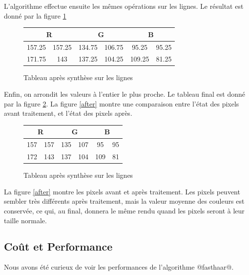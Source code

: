\documentclass{article}
\begin{document}
L'algorithme effectue ensuite les mêmes opérations sur les lignes. Le résultat est donné par la figure  \ref{tab6}

\begin{figure}[!h]
\begin{center}
\begin{tabular}{|c|c|c|c|c|c|}
\hline
\multicolumn{2}{|c|}{R} & \multicolumn{2}{|c|}{G}  & \multicolumn{2}{|c|}{B} \\
\hline
157.25    & 157.25   &   134.75  & 106.75 &   95.25  & 95.25   \\ 
\hline
171.75    & 143   &   137.25  & 104.25 &   109.25  & 81.25 \\
\hline
\end{tabular}
\end{center}
\caption{Tableau après synthèse sur les lignes}
\label{tab6}
\end{figure}

Enfin, on arrondit les valeurs à l'entier le plus proche. Le tableau final est donné par la figure \ref{tab7}. La figure \ref{after} montre une comparaison entre l'état des pixels avant traitement, et l'état des pixels après.

\begin{figure}[!h]
\begin{center}
\begin{tabular}{|c|c|c|c|c|c|}
\hline
\multicolumn{2}{|c|}{R} & \multicolumn{2}{|c|}{G}  & \multicolumn{2}{|c|}{B} \\
\hline
157    & 157  &   135  & 107 &   95  & 95   \\ 
\hline
172   & 143   &   137  & 104 &   109  & 81 \\
\hline
\end{tabular}
\end{center}
\caption{Tableau après synthèse sur les lignes}
\label{tab7}
\end{figure}


La figure \ref{after} montre les pixels avant et après traitement. Les pixels peuvent sembler très différents après traitement, mais la valeur moyenne des couleurs est conservée, ce qui, au final, donnera le même rendu quand les pixels seront à leur taille normale.


\subsection{Coût et Performance}

Nous avons été curieux de voir les performances de l'algorithme @fasthaar@.
\end{document}
